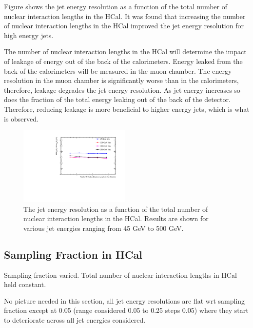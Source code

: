 \documentclass[final,3p,times,twocolumn]{elsarticle}
\begin{document}
Figure \label{HCalDepth} shows the jet energy resolution as a function of the total number of nuclear interaction lengths in the HCal.  It was found that increasing the number of nuclear interaction lengths in the HCal improved the jet energy resolution for high energy jets.  

The number of nuclear interaction lengths in the HCal will determine the impact of leakage of energy out of the back of the calorimeters.  Energy leaked from the back of the calorimeters will be measured in the muon chamber.  The energy resolution in the muon chamber is significantly worse than in the calorimeters, therefore, leakage degrades the jet energy resolution.  As jet energy increases so does the fraction of the total energy leaking out of the back of the detector.  Therefore, reducing leakage is more beneficial to higher energy jets, which is what is observed.

\begin{figure}[!h]
  \begin{center}
     \includegraphics[width=0.49\textwidth]{6_HCalParamScan/JER_vs_NumberOfNuclearInterationLengthsInTheHCal.pdf}
     \caption{The jet energy resolution as a function of the total number of nuclear interaction lengths in the HCal.  Results are shown for various jet energies ranging from 45 GeV to 500 GeV.\label{HCalDepth}}
  \end{center}
\end{figure}

\subsection{Sampling Fraction in HCal}


Sampling fraction varied.  Total number of nuclear interaction lengths in HCal held constant. 

No picture needed in this section, all jet energy resolutions are flat wrt sampling fraction except at 0.05 (range considered 0.05 to 0.25 steps 0.05) where they start to 
deteriorate across all jet energies considered.  
\end{document}
